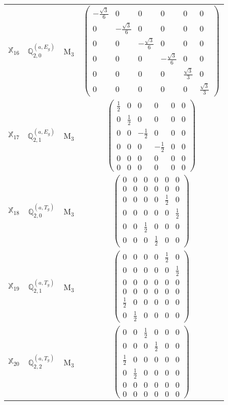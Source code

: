 \documentclass[fleqn,10pt,landscape]{article}
\begin{document}
\begin{itemize}
\begin{center}
\begin{longtable}{c|c|c|c}
$ \mathbb{X}_{16} $ & $\mathbb{Q}_{2,0}^{(a,E_{g})}$ & M$_{3}$ & $\begin{pmatrix} - \frac{\sqrt{3}}{6} & 0 & 0 & 0 & 0 & 0 \\ 0 & - \frac{\sqrt{3}}{6} & 0 & 0 & 0 & 0 \\ 0 & 0 & - \frac{\sqrt{3}}{6} & 0 & 0 & 0 \\ 0 & 0 & 0 & - \frac{\sqrt{3}}{6} & 0 & 0 \\ 0 & 0 & 0 & 0 & \frac{\sqrt{3}}{3} & 0 \\ 0 & 0 & 0 & 0 & 0 & \frac{\sqrt{3}}{3} \end{pmatrix}$ \\
$ \mathbb{X}_{17} $ & $\mathbb{Q}_{2,1}^{(a,E_{g})}$ & M$_{3}$ & $\begin{pmatrix} \frac{1}{2} & 0 & 0 & 0 & 0 & 0 \\ 0 & \frac{1}{2} & 0 & 0 & 0 & 0 \\ 0 & 0 & - \frac{1}{2} & 0 & 0 & 0 \\ 0 & 0 & 0 & - \frac{1}{2} & 0 & 0 \\ 0 & 0 & 0 & 0 & 0 & 0 \\ 0 & 0 & 0 & 0 & 0 & 0 \end{pmatrix}$ \\
$ \mathbb{X}_{18} $ & $\mathbb{Q}_{2,0}^{(a,T_{g})}$ & M$_{3}$ & $\begin{pmatrix} 0 & 0 & 0 & 0 & 0 & 0 \\ 0 & 0 & 0 & 0 & 0 & 0 \\ 0 & 0 & 0 & 0 & \frac{1}{2} & 0 \\ 0 & 0 & 0 & 0 & 0 & \frac{1}{2} \\ 0 & 0 & \frac{1}{2} & 0 & 0 & 0 \\ 0 & 0 & 0 & \frac{1}{2} & 0 & 0 \end{pmatrix}$ \\
$ \mathbb{X}_{19} $ & $\mathbb{Q}_{2,1}^{(a,T_{g})}$ & M$_{3}$ & $\begin{pmatrix} 0 & 0 & 0 & 0 & \frac{1}{2} & 0 \\ 0 & 0 & 0 & 0 & 0 & \frac{1}{2} \\ 0 & 0 & 0 & 0 & 0 & 0 \\ 0 & 0 & 0 & 0 & 0 & 0 \\ \frac{1}{2} & 0 & 0 & 0 & 0 & 0 \\ 0 & \frac{1}{2} & 0 & 0 & 0 & 0 \end{pmatrix}$ \\
$ \mathbb{X}_{20} $ & $\mathbb{Q}_{2,2}^{(a,T_{g})}$ & M$_{3}$ & $\begin{pmatrix} 0 & 0 & \frac{1}{2} & 0 & 0 & 0 \\ 0 & 0 & 0 & \frac{1}{2} & 0 & 0 \\ \frac{1}{2} & 0 & 0 & 0 & 0 & 0 \\ 0 & \frac{1}{2} & 0 & 0 & 0 & 0 \\ 0 & 0 & 0 & 0 & 0 & 0 \\ 0 & 0 & 0 & 0 & 0 & 0 \end{pmatrix}$ \\

\end{longtable}
\end{center}
\end{itemize}
\end{document}
